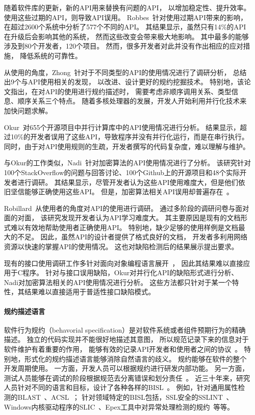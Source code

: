 随着软件库的更新，新的API用来替换有问题的API，
以增加稳定性、提升效率。
使用这些过期的API，则导致API误用。
Robbes~\cite{12-fse-deprecation, 18-sqj-evolution}针对使用过期API带来的影响，
在超过2600个系统中分析了577个不同的API。
其结果显示，虽然只有14\%的API在升级后会影响其他的系统，
然而这些改变会带来极大地影响。
其中最多的能够涉及到80个开发者，120个项目。
然而，很多开发者对此并没有作出相应的应对措施，
降低系统的可靠性。

从使用的角度，Zhong~\cite{17-tse-survey}针对于不同类型的API的使用情况进行了调研分析，
总结出9个与API使用相关的发现，
以改进、设计更好的规约挖掘技术。
特别地，该论文指出，在对API的使用进行规约描述时，
需要考虑非顺序调用关系、类型信息、顺序关系三个特点。
随着多核处理器的发展，开发人开始利用并行化技术来加快问题求解。

Okur~\cite{12-fse-parallel}对655个开源项目中并行计算库中的API使用情况进行分析。
结果显示，超过10\%的开发者误用了这些API，导致程序并没有并行化运行，而是在串行执行。
同时，由于对API使用规则的生疏，开发者撰写的代码复杂度，难以理解与维护。

与Okur的工作类似，Nadi~\cite{16-icse-cry}针对加密算法的API使用情况进行了分析。
该研究针对100个StackOverflow的问题与回答讨论、100个Github上的开源项目和48个实际开发者进行调研。
其结果显示，尽管开发者认为这些API使用难度大，但是他们依旧坚信能够正确使用这些API。
但是，加密算法相关API误用却普遍存在~\cite{13-ccs-misuse}。

Robillard~\cite{11-ese-learning}从使用者的角度对API的使用进行调研。
通过多阶段的调研问卷与面对面的对面，
该研究发现开发者认为API学习难度大。
其主要原因是现有的文档形式难以有效地帮助使用者正确使用API。
特别地，缺少足够的使用样例是文档最大的不足。
因此，虽然API的设计者提供了格式良好的文档，
开发者多利用网络资源以快速的掌握API的使用情况。
这也对缺陷检测后的结果展示提出要求。

现有的接口使用调研工作多针对面向对象编程语言展开~\cite{16-icse-cry,17-tse-survey, 12-fse-parallel,12-fse-deprecation}，
因此其结果难以直接应用于C程序。
针对与接口误用缺陷，Okur对并行化API的缺陷形式进行分析、
Nadi对加密算法相关的API使用情况进行分析。
这些方法都只针对于某一个特性，其结果难以直接适用于普适性接口缺陷模式。


\paragraph{规约描述语言}
软件行为规约（behavorial specification）是对软件系统或者组件预期行为的精确描述。
独立的代码实现并不能很好地描述其意图，
所以规范记录下来的信息对于软件维护有着重要的作用，
能够有效的记录API开发者和使用者之间的协议~\cite{92-ieee-contract}。
特别地，形式化的规约描述语言能够消除自然语言的歧义。
规约能够在软件的整个开发周期使用。
一方面，开发人员可以根据规约进行研发内部功能。
另一方面，测试人员能够在调试的阶段根据规范去分离错误和划分责任~\cite{05-vstte-spec}。
近三十年来，研究人员针对不同的语言和目标，设计了各种各样的BISL~\cite{survey12}。
例如，针对通用属性检测的BLAST~\cite{blast}、ACSL~\cite{acsl}；
针对领域特定的BISL包括，SSL安全的SSLINT~\cite{15-sp-sslint}、Windows内核驱动程序的SLIC~\cite{01-slic}、Epex工具中对异常处理检测的规约~\cite{16-sec-epex}等等。


